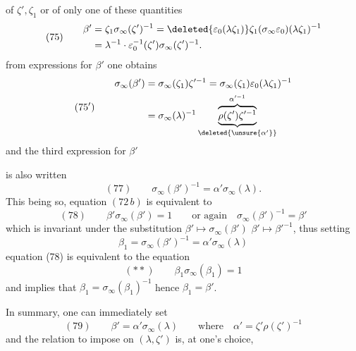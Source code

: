of $\zeta',\zeta_1$ or of only one of these quantities
\[
(75)\qquad\begin{aligned}
\beta'&=\zeta_1\sigma_\infty(\zeta')^{-1}=\deleted{\varepsilon_0(\lambda\zeta_1)}\zeta_1(\sigma_\infty\varepsilon_0)(\lambda\zeta_1)^{-1}\\
&=\lambda^{-1}\cdot\varepsilon_0^{-1}(\zeta')\sigma_\infty(\zeta')^{-1}.
\end{aligned}
\]
from   expressions for $\beta'$ one obtains
\[
(75')\qquad\begin{aligned}
\sigma_\infty(\beta')&=\sigma_\infty(\zeta_1)\zeta'^{-1}=\sigma_\infty(\zeta_1)\varepsilon_0(\lambda\zeta_1)^{-1}\\
&=\sigma_\infty(\lambda)^{-1}\underbrace{\overbrace{\rho(\zeta')\zeta'^{-1}}^{\alpha'^{-1}}}_{\deleted{\unsure{\alpha'}}}
\end{aligned}
\]
and the third expression for $\beta'$ 

\deleted{\[(77)\qquad\beta'\sigma_\infty(\beta')=1\]}
is also written
\[
(77)\qquad\sigma_\infty(\beta')^{-1}=\alpha'\sigma_\infty(\lambda).
\]
This being so, equation $(72\,b)$ is equivalent to
\[
(78)\qquad\beta'\sigma_\infty(\beta')=1\qquad\text{or again}\quad\sigma_\infty(\beta')^{-1}=\beta'
\]
which is invariant under the substitution $\beta'\mapsto\sigma_\infty(\beta')$  $\beta'\mapsto\beta'^{-1}$, thus setting
\[
\beta_1=\sigma_\infty(\beta')^{-1}=\alpha'\sigma_\infty(\lambda)
\]
equation (78) is equivalent to the equation
\[
(**)\qquad\beta_1\sigma_\infty(\beta_1)=1
\]
and implies that $\beta_1=\sigma_\infty(\beta_1)^{-1}$ hence $\beta_1=\beta'$.

In summary, one can immediately set
\[
(79)\qquad\beta'=\alpha'\sigma_\infty(\lambda)\qquad\text{where}\quad\alpha'=\zeta'\rho(\zeta')^{-1}
\]
and the relation to impose on $(\lambda,\zeta')$ is, at one's choice,
